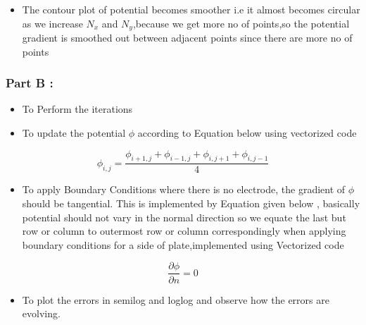\documentclass[11pt, a4paper]{article}
\begin{document}
   \begin{itemize}
   \item
     The contour plot of potential becomes smoother i.e it almost becomes
     circular as we increase \(N_x\) and \(N_y\),because we get more no of
     points,so the potential gradient is smoothed out between adjacent
     points since there are more no of points
   \end{itemize}
   \newpage
   \subsubsection{Part B :}\label{part-b}

   \begin{itemize}
   \item
     To Perform the iterations
   \item
     To update the potential \(\phi\) according to Equation below using
     vectorized code
   \end{itemize}
   
   \begin{equation}
           \phi_{i,j} = \frac{\phi_{i+1,j} + \phi_{i-1,j} + \phi_{i,j+1} + \phi_{i,j-1}}{4} 
   \end{equation}
   
   \begin{itemize}
   \item
     To apply Boundary Conditions where there is no electrode, the gradient
     of \(\phi\) should be tangential. This is implemented by Equation
     given below , basically potential should not vary in the normal
     direction so we equate the last but row or column to outermost row or
     column correspondingly when applying boundary conditions for a side of
     plate,implemented using Vectorized code
   \end{itemize}
   
   \begin{equation}
    \frac{\partial \phi}{\partial n} = 0
   \end{equation}
   
   \begin{itemize}
   \item
     To plot the errors in semilog and loglog and observe how the errors
     are evolving.
   \end{itemize}
\end{document}
